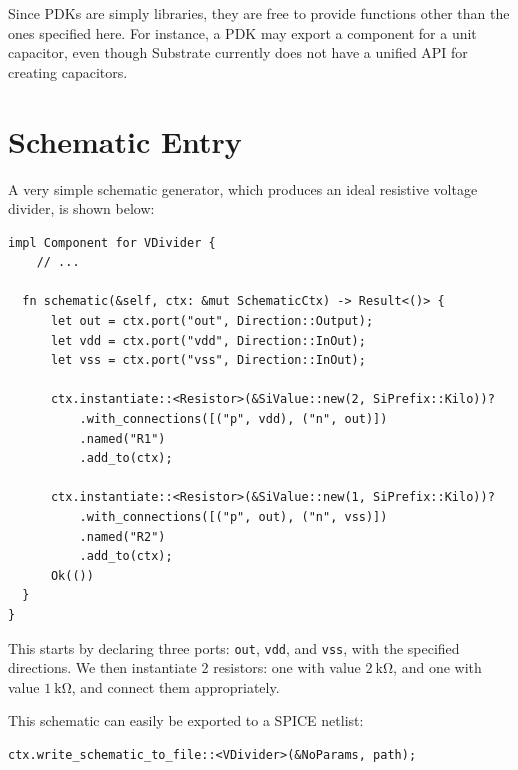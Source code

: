 Since PDKs are simply libraries, they are free to provide functions other than the ones specified here.
For instance, a PDK may export a component for a unit capacitor, even though Substrate currently does not
have a unified API for creating capacitors.

\section{Schematic Entry}

A very simple schematic generator, which produces an ideal resistive voltage divider, is shown below:

\begin{verbatim}
impl Component for VDivider {
    // ...
    
  fn schematic(&self, ctx: &mut SchematicCtx) -> Result<()> {
      let out = ctx.port("out", Direction::Output);
      let vdd = ctx.port("vdd", Direction::InOut);
      let vss = ctx.port("vss", Direction::InOut);

      ctx.instantiate::<Resistor>(&SiValue::new(2, SiPrefix::Kilo))?
          .with_connections([("p", vdd), ("n", out)])
          .named("R1")
          .add_to(ctx);

      ctx.instantiate::<Resistor>(&SiValue::new(1, SiPrefix::Kilo))?
          .with_connections([("p", out), ("n", vss)])
          .named("R2")
          .add_to(ctx);
      Ok(())
  }
}
\end{verbatim}

This starts by declaring three ports: \verb|out|, \verb|vdd|, and \verb|vss|, with the specified directions.
We then instantiate 2 resistors: one with value $\SI{2}{\kilo\ohm}$, and one with value $\SI{1}{\kilo\ohm}$,
and connect them appropriately.

This schematic can easily be exported to a SPICE netlist:

\begin{verbatim}
ctx.write_schematic_to_file::<VDivider>(&NoParams, path);
\end{verbatim}

